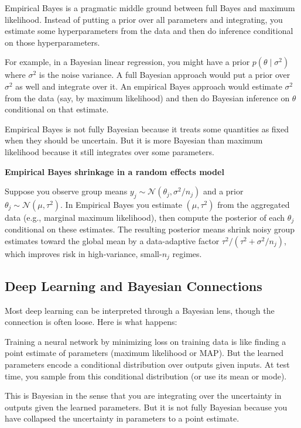 Empirical Bayes is a pragmatic middle ground between full Bayes and maximum likelihood. Instead of putting a prior over all parameters and integrating, you estimate some hyperparameters from the data and then do inference conditional on those hyperparameters.

For example, in a Bayesian linear regression, you might have a prior $p(\theta \mid \sigma^2)$ where $\sigma^2$ is the noise variance. A full Bayesian approach would put a prior over $\sigma^2$ as well and integrate over it. An empirical Bayes approach would estimate $\sigma^2$ from the data (say, by maximum likelihood) and then do Bayesian inference on $\theta$ conditional on that estimate.

Empirical Bayes is not fully Bayesian because it treats some quantities as fixed when they should be uncertain. But it is more Bayesian than maximum likelihood because it still integrates over some parameters.


\vspace{0.5em}
\begin{examplebox}
\textbf{Empirical Bayes shrinkage in a random effects model}

Suppose you observe group means $y_j\sim \mathcal{N}(\theta_j, \sigma^2/n_j)$ and a prior $\theta_j\sim \mathcal{N}(\mu, \tau^2)$. In Empirical Bayes you estimate $(\mu,\tau^2)$ from the aggregated data (e.g., marginal maximum likelihood), then compute the posterior of each $\theta_j$ conditional on these estimates. The resulting posterior means shrink noisy group estimates toward the global mean by a data-adaptive factor $\tau^2/(\tau^2+\sigma^2/n_j)$, which improves risk in high-variance, small-$n_j$ regimes.
\end{examplebox}
\subsection{Deep Learning and Bayesian Connections}

Most deep learning can be interpreted through a Bayesian lens, though the connection is often loose. Here is what happens:

Training a neural network by minimizing loss on training data is like finding a point estimate of parameters (maximum likelihood or MAP). But the learned parameters encode a conditional distribution over outputs given inputs. At test time, you sample from this conditional distribution (or use its mean or mode).

This is Bayesian in the sense that you are integrating over the uncertainty in outputs given the learned parameters. But it is not fully Bayesian because you have collapsed the uncertainty in parameters to a point estimate.

